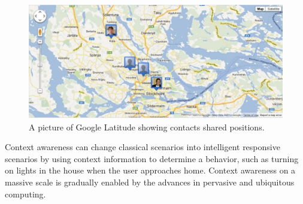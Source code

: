 \begin{figure}[t] %
	\centering
    	\includegraphics[scale=0.75]{part_2/context_awareness/latitude_pic.jpg}
		\caption{A picture of Google Latitude showing contacts shared positions.} 
		\label{googlelat}
\end{figure}

Context awareness can change classical scenarios into intelligent responsive scenarios by using context information to determine a behavior, such as turning on lights in the house when the user approaches home. Context awareness on a massive scale is gradually enabled by the advances in pervasive and ubiquitous computing.

